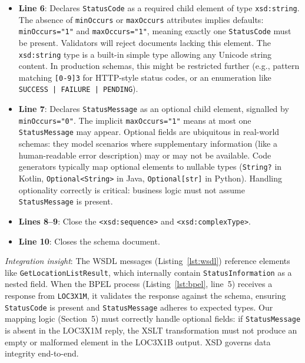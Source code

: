 \documentclass[11pt]{article}
\begin{document}
\begin{itemize}
  \item \textbf{Line 6}: Declares \texttt{StatusCode} as a required child element of type \texttt{xsd:string}. The absence of \texttt{minOccurs} or \texttt{maxOccurs} attributes implies defaults: \texttt{minOccurs="1"} and \texttt{maxOccurs="1"}, meaning exactly one \texttt{StatusCode} must be present. Validators will reject documents lacking this element. The \texttt{xsd:string} type is a built-in simple type allowing any Unicode string content. In production schemas, this might be restricted further (e.g., pattern matching \texttt{[0-9]{3}} for HTTP-style status codes, or an enumeration like \texttt{SUCCESS | FAILURE | PENDING}).
  
  \item \textbf{Line 7}: Declares \texttt{StatusMessage} as an optional child element, signalled by \texttt{minOccurs="0"}. The implicit \texttt{maxOccurs="1"} means at most one \texttt{StatusMessage} may appear. Optional fields are ubiquitous in real-world schemas: they model scenarios where supplementary information (like a human-readable error description) may or may not be available. Code generators typically map optional elements to nullable types (\texttt{String?} in Kotlin, \texttt{Optional<String>} in Java, \texttt{Optional[str]} in Python). Handling optionality correctly is critical: business logic must not assume \texttt{StatusMessage} is present.
  
  \item \textbf{Lines 8--9}: Close the \texttt{<xsd:sequence>} and \texttt{<xsd:complexType>}.
  
  \item \textbf{Line 10}: Closes the schema document.
\end{itemize}

\noindent\emph{Integration insight}: The WSDL messages (Listing~\ref{lst:wsdl}) reference elements like \texttt{GetLocationListResult}, which internally contain \texttt{StatusInformation} as a nested field. When the BPEL process (Listing~\ref{lst:bpel}, line~5) receives a response from \texttt{LOC3X1M}, it validates the response against the schema, ensuring \texttt{StatusCode} is present and \texttt{StatusMessage} adheres to expected types. Our mapping logic (Section~5) must correctly handle optional fields: if \texttt{StatusMessage} is absent in the LOC3X1M reply, the XSLT transformation must not produce an empty or malformed element in the LOC3X1B output. XSD governs data integrity end-to-end.
\end{document}
